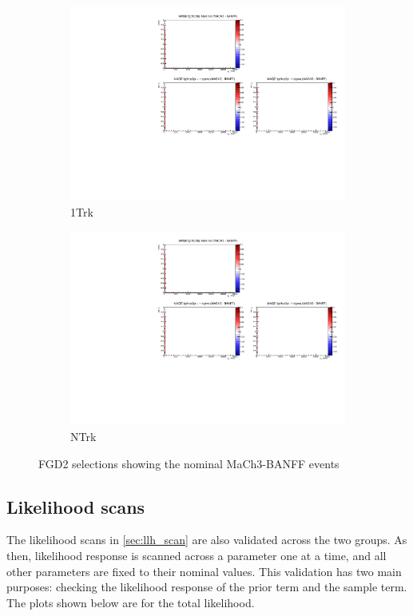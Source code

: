 \begin{figure}[h]
\begin{subfigure}[t]{0.24\textwidth}
		\includegraphics[width=\textwidth, trim={5mm 70mm 100mm 7mm}, clip, page=13]{figures/mach3/banff/momentumProjections_170328_withMACH3_MAQEonly}
		\caption{\numu 1Trk}
	\end{subfigure}
	\begin{subfigure}[t]{0.24\textwidth}
		\includegraphics[width=\textwidth, trim={5mm 70mm 100mm 7mm}, clip, page=14]{figures/mach3/banff/momentumProjections_170328_withMACH3_MAQEonly}
		\caption{\numu NTrk}
	\end{subfigure}
	\caption{FGD2 selections showing the nominal MaCh3-BANFF events}
	\label{fig:mach3_banff_prefit_fgd2}
\end{figure}

\subsection{Likelihood scans}
The likelihood scans in \autoref{sec:llh_scan} are also validated across the two groups. As then, likelihood response is scanned across a parameter one at a time, and all other parameters are fixed to their nominal values. This validation has two main purposes: checking the likelihood response of the prior term and the sample term. The plots shown below are for the total likelihood.

